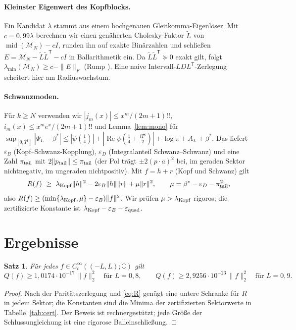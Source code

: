 \documentclass[11pt,a4paper]{article}
\newtheorem{theorem}{Satz}
\theoremstyle{definition}
\renewcommand{\Re}{\operatorname{Re}}
\newcommand{\eps}{\varepsilon}
\begin{document}
\paragraph{Kleinster Eigenwert des Kopfblocks.} Ein Kandidat $\lambda$ stammt aus einem hochgenauen Gleitkomma-Eigenlöser. Mit $c=0{,}99\lambda$ berechnen wir einen genäherten Cholesky-Faktor $\tilde L$ von $\operatorname{mid}(\mathcal M_N)-cI$, runden ihn auf exakte Binärzahlen und schließen $E=\mathcal M_N-\tilde L\tilde L^{\mathsf T}-cI$ in Ballarithmetik ein. Da $\tilde L\tilde L^{\mathsf T}\succeq0$ exakt gilt, folgt $\lambda_{\min}(\mathcal M_N)\ge c-\|E\|_F$ (Rump \cite{Rump10}). Eine naive Intervall-$LDL^{\mathsf T}$-Zerlegung scheitert hier am Radiuswachstum.

\paragraph{Schwanzmoden.} Für $k\ge N$ verwenden wir $|j_m(x)|\le x^m/(2m+1)!!$, $i_m(x)\le x^me^x/(2m+1)!!$ und Lemma~\ref{lem:mono} für $\sup_{[0,T^\sharp]}|\Psi_L-\beta^*|\le|\psi(\frac14)|+|\Re\psi(\frac14+\frac{iT^\sharp}2)|+\log\pi+A_L+\beta^*$. Das liefert $\eps_B$ (Kopf--Schwanz-Kopplung), $\eps_D$ (Integralanteil Schwanz--Schwanz) und eine Zahl $\pi_{\rm tail}$ mit $2\|p_{\rm tail}\|\le\pi_{\rm tail}$ (der Pol trägt $\pm2(p\cdot a)^2$ bei, im geraden Sektor nichtnegativ, im ungeraden nichtpositiv). Mit $f=h+r$ (Kopf und Schwanz) gilt
\[
R(f)\ \ge\ \lambda_{\rm Kopf}\|h\|^2-2\eps_B\|h\|\|r\|+\mu\|r\|^2,\qquad \mu=\beta^*-\eps_D-\pi_{\rm tail}^2 ,
\]
also $R(f)\ge(\min\{\lambda_{\rm Kopf},\mu\}-\eps_B)\|f\|^2$. Wir prüfen $\mu>\lambda_{\rm Kopf}$ rigoros; die zertifizierte Konstante ist $\lambda_{\rm Kopf}-\eps_B-\eps_{\rm quad}$.

\section{Ergebnisse}

\begin{theorem}\label{thm:main}
Für jedes $f\in C_c^\infty((-L,L);\mathbb C)$ gilt
\[
Q(f)\ge 1{,}0174\cdot10^{-17}\,\|f\|_2^2\quad\text{für }L=0{,}8,\qquad
Q(f)\ge 2{,}9256\cdot10^{-23}\,\|f\|_2^2\quad\text{für }L=0{,}9 .
\]
\end{theorem}
\begin{proof}
Nach der Paritätszerlegung und \eqref{eq:R} genügt eine untere Schranke für $R$ in jedem Sektor; die Konstanten sind die Minima der zertifizierten Sektorwerte in Tabelle~\ref{tab:cert}. Der Beweis ist rechnergestützt; jede Größe der Schlussungleichung ist eine rigorose Balleinschließung.
\end{proof}
\end{document}
